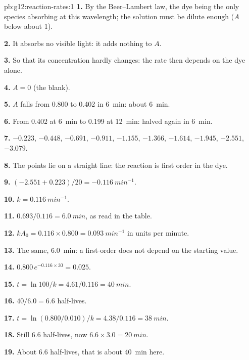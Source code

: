 \begin{solution}{pb:g12:reaction-rates:1}
\textbf{1.} By the Beer--Lambert law, the dye being the only species
absorbing at this wavelength; the solution must be dilute enough
($A$ below about 1).

\textbf{2.} It absorbs no visible light: it adds nothing to $A$.

\textbf{3.} So that its concentration hardly changes: the rate then
depends on the dye alone.

\textbf{4.} $A = 0$ (the blank).

\textbf{5.} $A$ falls from 0.800 to 0.402 in \qty{6}{min}: about
\qty{6}{min}.

\textbf{6.} From 0.402 at \qty{6}{min} to 0.199 at \qty{12}{min}: halved
again in \qty{6}{min}.

\textbf{7.} $-0.223$, $-0.448$, $-0.691$, $-0.911$, $-1.155$, $-1.366$,
$-1.614$, $-1.945$, $-2.551$, $-3.079$.

\textbf{8.} The points lie on a straight line: the reaction is first
order in the dye.

\textbf{9.} $(-2.551 + 0.223)/20 = \qty{-0.116}{min^{-1}}$.

\textbf{10.} $k = \qty{0.116}{min^{-1}}$.

\textbf{11.} $0.693 / 0.116 = \qty{6.0}{min}$, as read in the table.

\textbf{12.} $k A_0 = 0.116 \times 0.800 = \qty{0.093}{min^{-1}}$ in
 units per minute.

\textbf{13.} The same, \qty{6.0}{min}: a first-order  does not
depend on the starting value.

\textbf{14.} $0.800\, e^{-0.116 \times 30} = 0.025$.

\textbf{15.} $t = \ln 100 / k = 4.61 / 0.116 = \qty{40}{min}$.

\textbf{16.} $40 / 6.0 = 6.6$ half-lives.

\textbf{17.} $t = \ln(0.800/0.010)/k = 4.38 / 0.116 = \qty{38}{min}$.

\textbf{18.} Still 6.6 half-lives, now $6.6 \times 3.0 = \qty{20}{min}$.

\textbf{19.} About 6.6 half-lives, that is about \qty{40}{min} here.
\end{solution}
